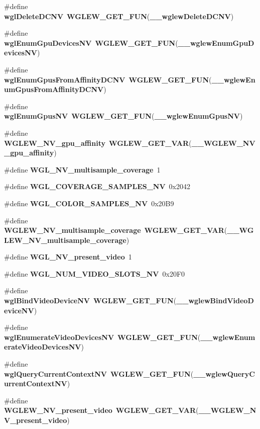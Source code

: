 \begin{DoxyCompactItemize}
\item 
\#define {\bf wgl\+Delete\+D\+C\+NV}~{\bf W\+G\+L\+E\+W\+\_\+\+G\+E\+T\+\_\+\+F\+UN}({\bf \+\_\+\+\_\+wglew\+Delete\+D\+C\+NV})
\item 
\#define {\bf wgl\+Enum\+Gpu\+Devices\+NV}~{\bf W\+G\+L\+E\+W\+\_\+\+G\+E\+T\+\_\+\+F\+UN}({\bf \+\_\+\+\_\+wglew\+Enum\+Gpu\+Devices\+NV})
\item 
\#define {\bf wgl\+Enum\+Gpus\+From\+Affinity\+D\+C\+NV}~{\bf W\+G\+L\+E\+W\+\_\+\+G\+E\+T\+\_\+\+F\+UN}({\bf \+\_\+\+\_\+wglew\+Enum\+Gpus\+From\+Affinity\+D\+C\+NV})
\item 
\#define {\bf wgl\+Enum\+Gpus\+NV}~{\bf W\+G\+L\+E\+W\+\_\+\+G\+E\+T\+\_\+\+F\+UN}({\bf \+\_\+\+\_\+wglew\+Enum\+Gpus\+NV})
\item 
\#define {\bf W\+G\+L\+E\+W\+\_\+\+N\+V\+\_\+gpu\+\_\+affinity}~{\bf W\+G\+L\+E\+W\+\_\+\+G\+E\+T\+\_\+\+V\+AR}({\bf \+\_\+\+\_\+\+W\+G\+L\+E\+W\+\_\+\+N\+V\+\_\+gpu\+\_\+affinity})
\item 
\#define {\bf W\+G\+L\+\_\+\+N\+V\+\_\+multisample\+\_\+coverage}~1
\item 
\#define {\bf W\+G\+L\+\_\+\+C\+O\+V\+E\+R\+A\+G\+E\+\_\+\+S\+A\+M\+P\+L\+E\+S\+\_\+\+NV}~0x2042
\item 
\#define {\bf W\+G\+L\+\_\+\+C\+O\+L\+O\+R\+\_\+\+S\+A\+M\+P\+L\+E\+S\+\_\+\+NV}~0x20\+B9
\item 
\#define {\bf W\+G\+L\+E\+W\+\_\+\+N\+V\+\_\+multisample\+\_\+coverage}~{\bf W\+G\+L\+E\+W\+\_\+\+G\+E\+T\+\_\+\+V\+AR}({\bf \+\_\+\+\_\+\+W\+G\+L\+E\+W\+\_\+\+N\+V\+\_\+multisample\+\_\+coverage})
\item 
\#define {\bf W\+G\+L\+\_\+\+N\+V\+\_\+present\+\_\+video}~1
\item 
\#define {\bf W\+G\+L\+\_\+\+N\+U\+M\+\_\+\+V\+I\+D\+E\+O\+\_\+\+S\+L\+O\+T\+S\+\_\+\+NV}~0x20\+F0
\item 
\#define {\bf wgl\+Bind\+Video\+Device\+NV}~{\bf W\+G\+L\+E\+W\+\_\+\+G\+E\+T\+\_\+\+F\+UN}({\bf \+\_\+\+\_\+wglew\+Bind\+Video\+Device\+NV})
\item 
\#define {\bf wgl\+Enumerate\+Video\+Devices\+NV}~{\bf W\+G\+L\+E\+W\+\_\+\+G\+E\+T\+\_\+\+F\+UN}({\bf \+\_\+\+\_\+wglew\+Enumerate\+Video\+Devices\+NV})
\item 
\#define {\bf wgl\+Query\+Current\+Context\+NV}~{\bf W\+G\+L\+E\+W\+\_\+\+G\+E\+T\+\_\+\+F\+UN}({\bf \+\_\+\+\_\+wglew\+Query\+Current\+Context\+NV})
\item 
\#define {\bf W\+G\+L\+E\+W\+\_\+\+N\+V\+\_\+present\+\_\+video}~{\bf W\+G\+L\+E\+W\+\_\+\+G\+E\+T\+\_\+\+V\+AR}({\bf \+\_\+\+\_\+\+W\+G\+L\+E\+W\+\_\+\+N\+V\+\_\+present\+\_\+video})

\end{DoxyCompactItemize}
